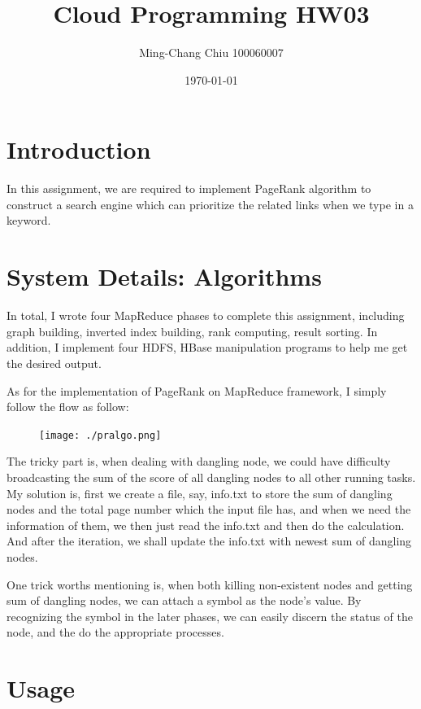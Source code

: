 \documentclass[12pt,a4paper]{article}
\title{Cloud Programming HW03}
\author{Ming-Chang Chiu 100060007}
\date{\today}
\begin{document}
\maketitle
\fontsize{12}{20pt}\selectfont %

\section{Introduction}
In this assignment, we are required to implement PageRank algorithm to construct a search engine which can prioritize the related links when we type in a keyword. 

\section{System Details: Algorithms}
In total, I wrote four MapReduce phases to complete this assignment, including graph building, inverted index building, rank computing, result sorting. In addition, I implement four HDFS, HBase manipulation programs to help me get the desired output.

As for the implementation of PageRank on MapReduce framework, I simply follow the flow as follow:
\begin{figure}[h!]
  \centering
     \texttt{[image: ./pralgo.png]}
\end{figure}

The tricky part is, when dealing with dangling node, we could have difficulty broadcasting the sum of the score of all dangling nodes to all other running tasks. My solution is, first we create a file, say, info.txt to store the sum of dangling nodes and the total page number which the input file has, and when we need the information of them, we then just read the info.txt and then do the calculation. And after the iteration, we shall update the info.txt with newest sum of dangling nodes.

One trick worths mentioning is, when both killing non-existent nodes and getting sum of dangling nodes, we can attach a symbol as the node's value. By recognizing the symbol in the later phases, we can easily discern the status of the node, and the do the appropriate processes.
\section{Usage}
\end{document}
